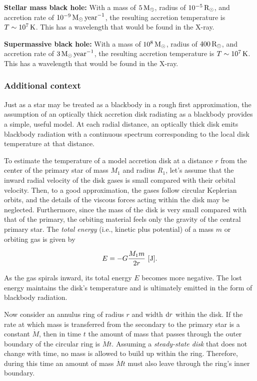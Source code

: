 \documentclass[a4paper,10pt]{article}
\begin{document}
{\noindent}\textbf{Stellar mass black hole:} With a mass of $5\,{\rm M_\odot}$, radius of $10^{-5}\,{\rm R_\odot}$, and accretion rate of $10^{-9}\,{\rm M_\odot\,year}^{-1}$, the resulting accretion temperature is $T\sim10^7\,{\rm K}$. This has a wavelength that would be found in the X-ray.

{\noindent}\textbf{Supermassive black hole:} With a mass of $10^8\,{\rm M_\odot}$, radius of $400\,{\rm R_\odot}$, and accretion rate of $3\,{\rm M_\odot\,year}^{-1}$, the resulting accretion temperature is $T\sim10^7\,{\rm K}$. This has a wavelength that would be found in the X-ray.

\subsubsection{Additional context}

Just as a star may be treated as a blackbody in a rough first approximation, the assumption of an optically thick accretion disk radiating as a blackbody provides a simple, useful model. At each radial distance, an optically thick disk emits blackbody radiation with a continuous spectrum corresponding to the local disk temperature at that distance.

{\noindent}To estimate the temperature of a model accretion disk at a distance $r$ from the center of the primary star of mass $M_1$ and radius $R_1$, let's assume that the inward radial velocity of the disk gases is small compared with their orbital velocity. Then, to a good approximation, the gases follow circular Keplerian orbits, and the details of the viscous forces acting within the disk may be neglected. Furthermore, since the mass of the disk is very small compared with that of the primary, the orbiting material feels only the gravity of the central primary star. The \textit{total energy} (i.e., kinetic plus potential) of a mass $m$ or orbiting gas is given by

\begin{align*}
E = -G\frac{M_1m}{2r} ~ [{\rm J}].
\end{align*}

{\noindent}As the gas spirals inward, its total energy $E$ becomes more negative. The lost energy maintains the disk's temperature and is ultimately emitted in the form of blackbody radiation.

{\noindent}Now consider an annulus ring of radius $r$ and width ${\rm d}r$ within the disk. If the rate at which mass is transferred from the secondary to the primary star is a constant $\dot{M}$, then in time $t$ the amount of mass that passes through the outer boundary of the circular ring is $\dot{M}t$. Assuming a \textit{steady-state disk} that does not change with time, no mass is allowed to build up within the ring. Therefore, during this time an amount of mass $\dot{M}t$ must also leave through the ring's inner boundary.
\end{document}
